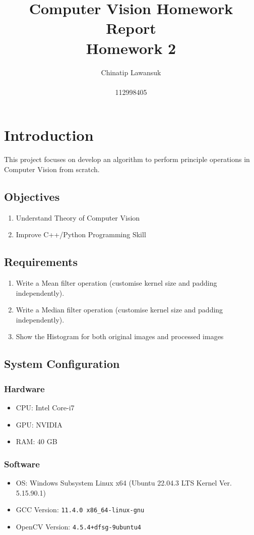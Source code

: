 \documentclass[12pt,a4paper]{report}
\title{Computer Vision Homework Report \\ \Large Homework 2}
\author{Chinatip Lawansuk\\\\112998405}
\date{}
\begin{document}
\maketitle

\tableofcontents

\chapter{Introduction}
This project focuses on develop an algorithm to perform principle operations in Computer Vision from scratch.

\section{Objectives}
\begin{enumerate}
  \item Understand Theory of Computer Vision
  \item Improve C++/Python Programming Skill
\end{enumerate}

\section{Requirements}
\begin{enumerate}
  \item Write a Mean filter operation (customise kernel size and padding independently).
  \item Write a Median filter operation (customise kernel size and padding independently).
  \item Show the Histogram for both original images and processed images
\end{enumerate}

\section{System Configuration}
\subsection{Hardware}
\begin{itemize}
  \item CPU\@: Intel Core-i7
  \item GPU\@: NVIDIA
  \item RAM\@: 40 GB
\end{itemize}

\subsection{Software}
\begin{itemize}
  \item OS\@: Windows Subsystem Linux x64 (Ubuntu 22.04.3 LTS Kernel Ver. 5.15.90.1)
  \item GCC Version\@: \verb|11.4.0 x86_64-linux-gnu|
  \item OpenCV Version\@: \verb|4.5.4+dfsg-9ubuntu4|
\end{itemize}
\end{document}

